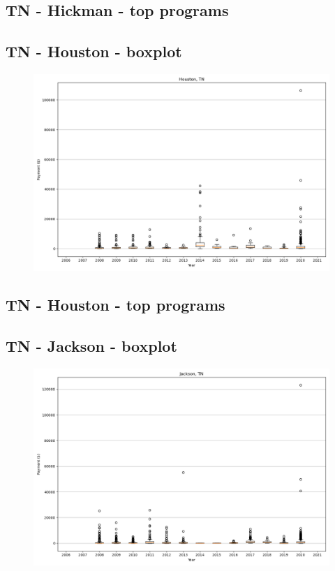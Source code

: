 \subsection*{TN - Hickman - top programs}

\newpage
\subsection*{TN - Houston - boxplot}
\begin{figure}[h]
\centering
\includegraphics[width=7in]{../output/boxplots/counties/Houston-TN_boxplot.png}
\end{figure}


\subsection*{TN - Houston - top programs}

\newpage
\subsection*{TN - Jackson - boxplot}
\begin{figure}[h]
\centering
\includegraphics[width=7in]{../output/boxplots/counties/Jackson-TN_boxplot.png}
\end{figure}


